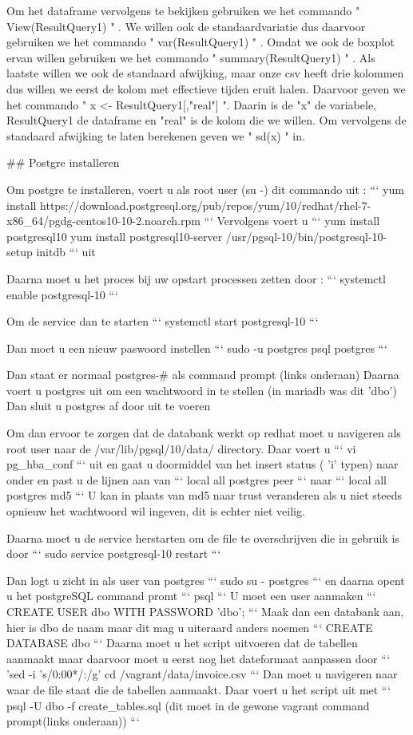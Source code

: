 \documentclass[fleqn,10pt]{artikeltin}
\begin{document}
Om het dataframe vervolgens te bekijken gebruiken we het commando " View(ResultQuery1) " .
We willen ook de standaardvariatie dus daarvoor gebruiken we het commando " var(ResultQuery1) " .
Omdat we ook de boxplot ervan willen gebruiken we het commando " summary(ResultQuery1) " .
Als laatste willen we ook de standaard afwijking, maar onze csv heeft drie kolommen dus willen we eerst de kolom met effectieve tijden eruit halen. Daarvoor geven we het commando " x <- ResultQuery1[,"real"] ". Daarin is de "x" de variabele, ResultQuery1 de dataframe en "real" is de kolom die we willen.
Om vervolgens de standaard afwijking te laten berekenen geven we " sd(x) " in.

## Postgre installeren

Om postgre te installeren, voert u als root user (su -) dit commando uit :
  ```
  yum install https://download.postgresql.org/pub/repos/yum/10/redhat/rhel-7-x86_64/pgdg-centos10-10-2.noarch.rpm
  ```
Vervolgens voert u
  ```
     yum install postgresql10
     yum install postgresql10-server
     /usr/pgsql-10/bin/postgresql-10-setup initdb
  ```
uit

Daarna moet u het proces bij uw opstart processen zetten door :
 ```
 systemctl enable postgresql-10
 ```

Om de service dan te starten
 ```
 systemctl start postgresql-10
 ```

Dan moet u een nieuw paswoord instellen 
 ```
 sudo -u postgres psql postgres
 ```

Dan staat er normaal postgres-# als command prompt (links onderaan)
Daarna voert u \password postgres uit om een wachtwoord in te stellen (in mariadb was dit 'dbo')
Dan sluit u postgres af door \q uit te voeren

Om dan ervoor te zorgen dat de databank werkt op redhat moet u navigeren als root user naar de 
/var/lib/pgsql/10/data/ directory.
Daar voert u 
 ```
 vi pg_hba_conf
 ``` 
uit en gaat u doormiddel van het insert status ( 'i' typen) naar onder en past u de lijnen aan van 
  ```
  local all postgres peer
  ```
naar 
  ``` 
  local all postgres md5
  ```
U kan in plaats van md5 naar trust veranderen als u niet steeds opnieuw het wachtwoord wil ingeven,
dit is echter niet veilig.

Daarna moet u de service herstarten om de file te overschrijven die in gebruik is door 
 ``` 
 sudo service postgresql-10 restart
 ```

Dan logt u zicht in als user van postgres
 ```
 sudo su - postgres
 ```
 en daarna opent u het postgreSQL command promt 
 ``` 
 psql
 ```
U moet een user aanmaken
 ``` 
 CREATE USER dbo WITH PASSWORD 'dbo';
 ```
Maak dan een databank aan, hier is dbo de naam maar dit mag u uiteraard anders noemen
 ```
 CREATE DATABASE dbo
 ```
Daarna moet u het script uitvoeren dat de tabellen aanmaakt maar daarvoor moet u eerst nog het dateformaat 
aanpassen door 
``` 
'sed -i 's/0:00*/:/g' cd /vagrant/data/invoice.csv 
```
Dan moet u navigeren naar waar de file staat die de tabellen aanmaakt.
Daar voert u het script uit met 
 ```
 psql -U dbo -f create_tables.sql (dit moet in de gewone vagrant command prompt(links onderaan))
 ```
\end{document}
